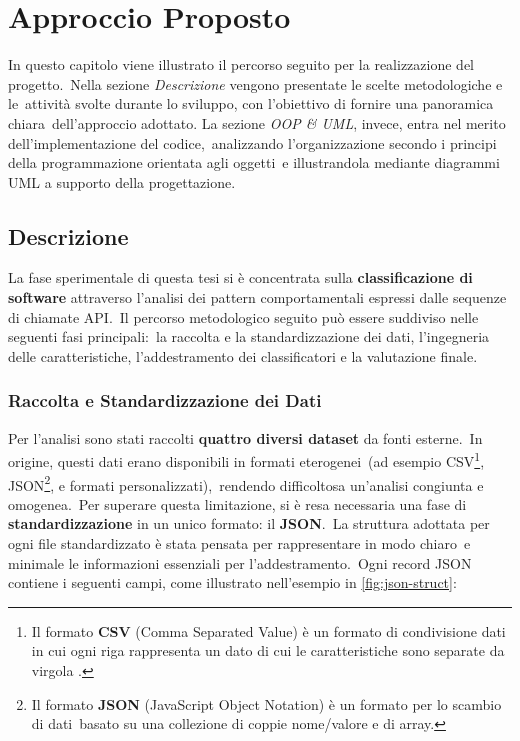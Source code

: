 \chapter{Approccio Proposto}

In questo capitolo viene illustrato il percorso seguito per la realizzazione del progetto.\
Nella sezione \textit{Descrizione} vengono presentate le scelte metodologiche e le\
attività svolte durante lo sviluppo, con l'obiettivo di fornire una panoramica chiara\
dell'approccio adottato. La sezione \textit{OOP \& UML}, invece, entra nel merito dell'implementazione del codice,\
analizzando l'organizzazione secondo i principi della programmazione orientata agli oggetti\
e illustrandola mediante diagrammi UML a supporto della progettazione.

\section{Descrizione}

La fase sperimentale di questa tesi si è concentrata sulla \textbf{classificazione di software} attraverso
l'analisi dei pattern comportamentali espressi dalle sequenze di chiamate API.\
Il percorso metodologico seguito può essere suddiviso nelle seguenti fasi principali:\
la raccolta e la standardizzazione dei dati, l'ingegneria delle caratteristiche, l'addestramento dei classificatori
e la valutazione finale.

\subsection{Raccolta e Standardizzazione dei Dati}

Per l'analisi sono stati raccolti \textbf{quattro diversi dataset} da fonti esterne.\
In origine, questi dati erano disponibili in formati eterogenei\
(ad esempio CSV\footnote{Il formato \textbf{CSV} (Comma Separated Value) è un formato di condivisione dati in cui ogni
    riga rappresenta un dato di cui le caratteristiche sono separate da virgola .},
JSON\footnote{Il formato \textbf{JSON} (JavaScript Object Notation) è un formato per lo scambio di dati\
    basato su una collezione di coppie nome/valore e di array.}, e formati personalizzati),\
rendendo difficoltosa un'analisi congiunta e omogenea.\
Per superare questa limitazione, si è resa necessaria una fase di \textbf{standardizzazione} in un unico formato:
il \textbf{JSON}.\
La struttura adottata per ogni file standardizzato è stata pensata per rappresentare in modo chiaro\
e minimale le informazioni essenziali per l'addestramento.\
Ogni record JSON contiene i seguenti campi, come illustrato nell'esempio in \autoref{fig:json-struct}:

